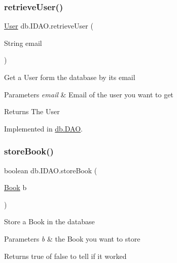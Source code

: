 \mbox{\label{interfacedb_1_1_i_d_a_o_ad00bb5255d0badadbf5244799c3b708f}} 
\subsubsection{\texorpdfstring{retrieve\+User()}{retrieveUser()}}
{\footnotesize\ttfamily \hyperlink{classserver_1_1data_1_1_user}{User} db.\+I\+D\+A\+O.\+retrieve\+User (\begin{DoxyParamCaption}\item[{String}]{email }\end{DoxyParamCaption})}

Get a User form the database by its email 
\begin{DoxyParams}{Parameters}
{\em email} & Email of the user you want to get \\
\hline
\end{DoxyParams}
\begin{DoxyReturn}{Returns}
The User 
\end{DoxyReturn}


Implemented in \hyperlink{classdb_1_1_d_a_o_a6da084ffd9b0da23acba9dc68e747303}{db.\+D\+AO}.

\mbox{\label{interfacedb_1_1_i_d_a_o_a39851dc1e1f05af40afeb76a5f8be99a}} 
\subsubsection{\texorpdfstring{store\+Book()}{storeBook()}}
{\footnotesize\ttfamily boolean db.\+I\+D\+A\+O.\+store\+Book (\begin{DoxyParamCaption}\item[{\hyperlink{classserver_1_1data_1_1_book}{Book}}]{b }\end{DoxyParamCaption})}

Store a Book in the database 
\begin{DoxyParams}{Parameters}
{\em b} & the Book you want to store \\
\hline
\end{DoxyParams}
\begin{DoxyReturn}{Returns}
true of false to tell if it worked 
\end{DoxyReturn}


